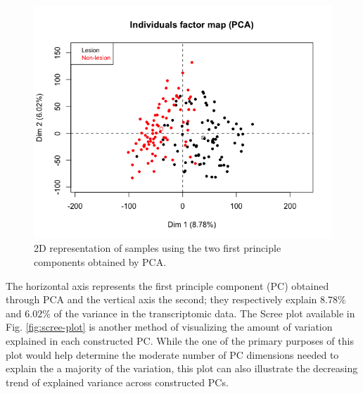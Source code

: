 \documentclass[journal, a4paper]{IEEEtran}
\begin{document}
\begin{figure}[!htp]
    \begin{center}
    \begin{minipage}{0.5 \textwidth}
      \centering
      \includegraphics[width=\textwidth]{../exploratory-data-analysis/pca-plot.png}
      \caption{2D representation of samples using the two first principle components obtained by PCA.}
      \label{fig:pca}
    \end{minipage}
  \end{center}
\end{figure}


The horizontal axis represents the first principle component (PC) obtained through PCA and the vertical axis the second; they respectively explain $8.78\%$ and $6.02\%$ of the variance in the transcriptomic data. The Scree plot available in Fig. \ref{fig:scree-plot} is another method of visualizing the amount of variation explained in each constructed PC. While the one of the primary purposes of this plot would help determine the moderate number of PC dimensions needed to explain the a majority of the variation, this plot can also illustrate the decreasing trend of explained variance across constructed PCs.\\%
\end{document}
